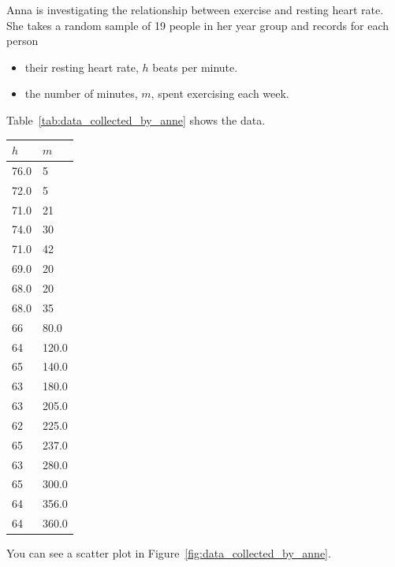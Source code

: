 Anna is investigating the relationship between exercise and resting heart rate.
She takes a random sample of 19 people in her year group and records for each person
\begin{itemize}
\item 

their resting heart rate, \(h\) beats per minute.

\item 

the number of minutes, \(m\), spent exercising each week.

\end{itemize}


Table~\ref{tab:data_collected_by_anne} shows the data.

\begin{table}[!htbp]
\begin{center}
\begin{tabular}{ll}
\toprule
\(h\) & \(m\)\\
\midrule
76.0 & 5\\
72.0 & 5\\
71.0 & 21\\
74.0 & 30\\
71.0 & 42\\
69.0 & 20\\
68.0 & 20\\
68.0 & 35\\
66 & 80.0\\
64 & 120.0\\
65 & 140.0\\
63 & 180.0\\
63 & 205.0\\
62 & 225.0\\
65 & 237.0\\
63 & 280.0\\
65 & 300.0\\
64 & 356.0\\
64 & 360.0\\
\bottomrule
\end{tabular}
\end{center}
\end{table}



You can see a scatter plot in
Figure~\ref{fig:data_collected_by_anne}.

